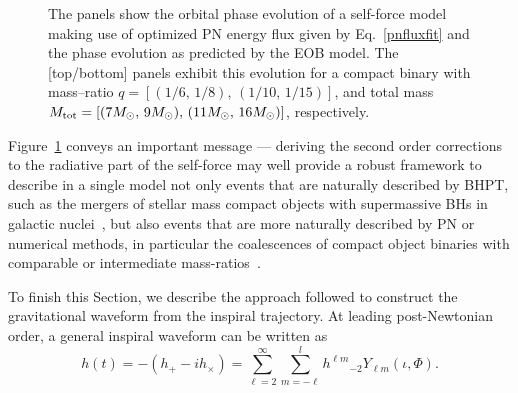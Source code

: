 \begin{figure}[ht]
{}
\caption{The panels show the orbital phase evolution of a self-force model making use of optimized PN energy flux given by Eq.~\eqref{pnfluxfit} and the phase evolution as predicted by the EOB model. The [top/bottom] panels exhibit this evolution for a compact binary with mass--ratio \(q=[(1/6,\,1/8), \,( 1/10,\,1/15)]\), and total mass \(M_{{\rm{tot}}}=[ (7M_{\odot} ,\, 9M_{\odot} ), \, ( 11M_{\odot},\, 16M_{\odot})  ]\), respectively. }
\label{PNoptimized}
\end{figure}

Figure~\ref{PNoptimized} conveys an important message --- deriving the second order corrections to the radiative part of the self-force may well provide a robust framework to describe in a single model not only events that are naturally described by BHPT, such as the mergers of stellar mass compact objects with supermassive BHs in galactic nuclei~\cite{Huerta:2012, Huerta:2010, wargar, cutler, gairles, SFB, GairL:2013}, but also events that are more naturally described by PN or numerical methods, in particular the coalescences of compact object binaries with comparable or intermediate mass-ratios~\cite{Huerta:2012, higherspin, Huerta:2011a, Huerta:2011b, smallbody}.

To finish this Section, we describe the approach followed to construct the gravitational waveform from the inspiral trajectory. At leading post-Newtonian order, a general inspiral waveform can be written as
\begin{equation}
h(t) = -(h_{+} - i h_{\times}) = \sum_{\ell=2}^{\infty} \sum_{m=-\ell}^{l} h^{\ell m} {}_{-\!2}Y_{\ell m}(\iota,\Phi).
\label{inspwav}
\end{equation}

